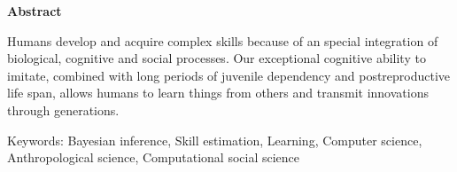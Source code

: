 \documentclass[a4paper,10pt]{book}
\theoremstyle{definition}
\begin{document}
\newpage

\begin{center}
\textbf{Abstract}
\end{center}



Humans develop and acquire complex skills because of an special integration of biological, cognitive and social processes.
%
Our exceptional cognitive ability to imitate, combined with long periods of juvenile dependency and postreproductive life span, allows humans to learn things from others and transmit innovations through generations.



\vspace{0.3cm}

\noindent Keywords: Bayesian inference, Skill estimation, Learning, Computer science, Anthropological science, Computational social science 



\tableofcontents

\newpage 
\end{document}
